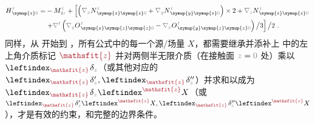 \begin{subequations}
\begin{align}
	H^{\;\!\mathcolor{gray}{t}}_{\;\! \symup{z} \mathcolor{gray}{0}} = & - M^{\;\!\mathcolor{gray}{t}}_{\;\! i \mathcolor{gray}{z}} + \left[ \left( \mathcolor{gray}{\nabla_x}
	N^{\;\!\mathcolor{gray}{t}}_{\;\! \symup{x}\symup{z} \mathcolor{gray}{0}} + \mathcolor{gray}{\nabla_y} N^{\;\!\mathcolor{gray}{t}}_{\;\! \symup{y}\symup{z} \mathcolor{gray}{0}} \right) \times 2 + \mathcolor{gray}{\nabla_z} N^{\;\!\mathcolor{gray}{t}}_{\;\! \symup{z}\symup{z} \mathcolor{gray}{0}} \right. \label{eq:H_z0=} \\ & \left. + \mathcolor{gray}{\nabla^t} \left( \mathcolor{gray}{\nabla_y}
	O^{\;\!\mathcolor{gray}{t}}_{\;\! \symup{x}\symup{z}\symup{z} \mathcolor{gray}{0}} - \mathcolor{gray}{\nabla_x}
	O^{\;\!\mathcolor{gray}{t}}_{\;\! \symup{y}\symup{z}\symup{z}\mathcolor{gray}{0}} \right) \big/ 3 \right] \big/ 2~.
\end{align}
\end{subequations}
同样，从  开始到 ，所有公式中的每一个源/场量 $X$，都需要继承并添补上  中的左上角介质标记 $\textcolor{Maroon}{\mathsfit{z}}$ 并对两侧半无限介质（在接触面 $\mathcolor{gray}{z \mathcolor{black}{=} 0}$ 处）乘以 $\leftindex_{\textcolor{Maroon}{\mathsfit{z}}} \;\! \delta_{\mathcolor{gray}{z}}$（或其他对应的 $\leftindex_{\textcolor{Maroon}{\mathsfit{z}}} \;\! \delta'_{\mathcolor{gray}{z}},\leftindex_{\textcolor{Maroon}{\mathsfit{z}}} \;\! \delta''_{\mathcolor{gray}{z}}$）并求和以成为 $\leftindex_{\textcolor{Maroon}{\mathsfit{z}}} \;\! \delta_{\mathcolor{gray}{z}} \leftindex^{\textcolor{Maroon}{\mathsfit{z}}} X$（或 $\leftindex_{\textcolor{Maroon}{\mathsfit{z}}} \;\! \delta'_{\mathcolor{gray}{z}} \leftindex^{\textcolor{Maroon}{\mathsfit{z}}} X,\leftindex_{\textcolor{Maroon}{\mathsfit{z}}} \;\! \delta''_{\mathcolor{gray}{z}} \leftindex^{\textcolor{Maroon}{\mathsfit{z}}} X$），才是有效的约束，和完整的边界条件。

